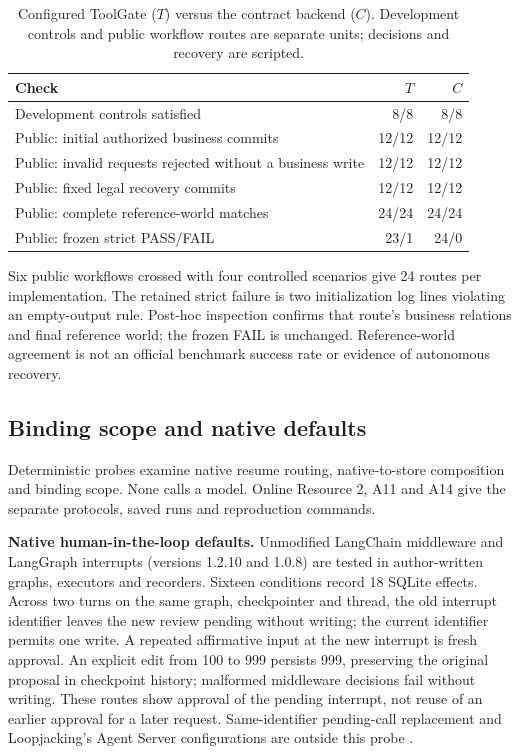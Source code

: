 \documentclass[pdflatex,sn-basic]{sn-jnl}
\begin{document}
\begin{table}[tbp]
\caption{Configured ToolGate ($T$) versus the contract backend ($C$). Development controls and public workflow routes are separate units; decisions and recovery are scripted.}
\label{tab:external}
\centering\small
\begin{tabularx}{\textwidth}{@{}Xrr@{}}
\toprule
Check & $T$ & $C$ \\
\midrule
Development controls satisfied & 8/8 & 8/8 \\
Public: initial authorized business commits & 12/12 & 12/12 \\
Public: invalid requests rejected without a business write & 12/12 & 12/12 \\
Public: fixed legal recovery commits & 12/12 & 12/12 \\
Public: complete reference-world matches & 24/24 & 24/24 \\
Public: frozen strict PASS/FAIL & 23/1 & 24/0 \\
\bottomrule
\end{tabularx}
\par\smallskip
\begin{minipage}{\textwidth}\small
Six public workflows crossed with four controlled scenarios give 24 routes per implementation.
The retained strict failure is two initialization log lines violating an empty-output rule.
Post-hoc inspection confirms that route's business relations and final reference world;
the frozen FAIL is unchanged. Reference-world agreement is not an official benchmark
success rate or evidence of autonomous recovery.
\end{minipage}
\end{table}

\subsection{Binding scope and native defaults}\label{binding-scope-and-native-defaults}

Deterministic probes examine native resume routing, native-to-store composition and binding scope. None calls a model. Online Resource 2, A11 and A14 give the separate protocols, saved runs and reproduction commands.

\textbf{Native human-in-the-loop defaults.} Unmodified LangChain middleware \citep{langchain-hitl} and LangGraph interrupts (versions 1.2.10 and 1.0.8) are tested in author-written graphs, executors and recorders. Sixteen conditions record 18 SQLite effects. Across two turns on the same graph, checkpointer and thread, the old interrupt identifier leaves the new review pending without writing; the current identifier permits one write. A repeated affirmative input at the new interrupt is fresh approval. An explicit edit from 100 to 999 persists 999, preserving the original proposal in checkpoint history; malformed middleware decisions fail without writing. These routes show approval of the pending interrupt, not reuse of an earlier approval for a later request. Same-identifier pending-call replacement and Loopjacking's Agent Server configurations are outside this probe \citep{kumar2026loopjacking}.
\end{document}
